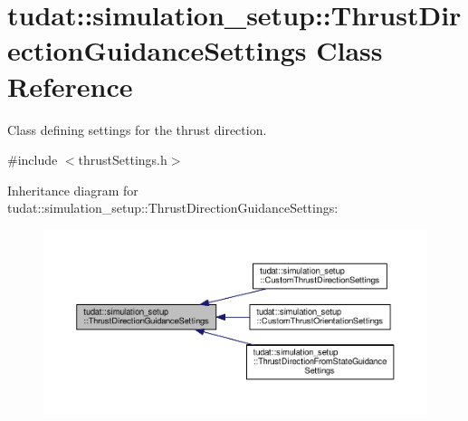 \hypertarget{classtudat_1_1simulation__setup_1_1ThrustDirectionGuidanceSettings}{}\section{tudat\+:\+:simulation\+\_\+setup\+:\+:Thrust\+Direction\+Guidance\+Settings Class Reference}
\label{classtudat_1_1simulation__setup_1_1ThrustDirectionGuidanceSettings}


Class defining settings for the thrust direction.  




{\ttfamily \#include $<$thrust\+Settings.\+h$>$}



Inheritance diagram for tudat\+:\+:simulation\+\_\+setup\+:\+:Thrust\+Direction\+Guidance\+Settings\+:
\nopagebreak
\begin{figure}[H]
\begin{center}
\leavevmode
\includegraphics[width=350pt]{classtudat_1_1simulation__setup_1_1ThrustDirectionGuidanceSettings__inherit__graph}
\end{center}
\end{figure}
